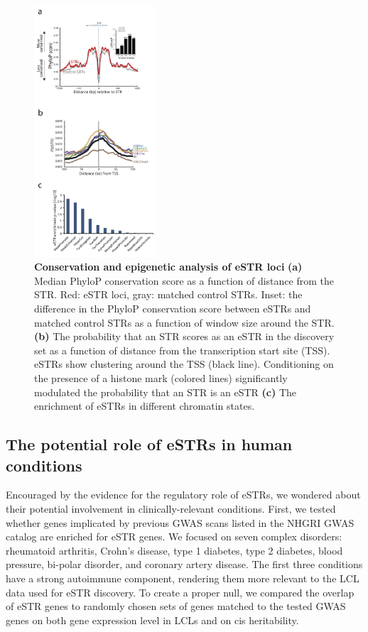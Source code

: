 \begin{figure}[h!]
\centering
\label{fig:estrfig4}
\includegraphics[width=0.4\textwidth]{Figures/Chapter4/Fig4}
\caption{\textbf{Conservation and epigenetic analysis of eSTR loci} \textbf{(a)} Median PhyloP conservation score as a function of distance from the STR. Red: eSTR loci, gray: matched control STRs. Inset: the difference in the PhyloP conservation score between eSTRs and matched control STRs as a function of window size around the STR. \textbf{(b)} The probability that an STR scores as an eSTR in the discovery set as a function of distance from the transcription start site (TSS). eSTRs show clustering around the TSS (black line). Conditioning on the presence of a histone mark (colored lines) significantly modulated the probability that an STR is an eSTR \textbf{(c)} The enrichment of eSTRs in different chromatin states.}
\end{figure}

\subsection{The potential role of eSTRs in human conditions}
Encouraged by the evidence for the regulatory role of eSTRs, we wondered about their potential involvement in clinically-relevant conditions. First, we tested whether genes implicated by previous GWAS scans listed in the NHGRI GWAS catalog \cite{WelterMacArthurMoralesEtAl2014} are enriched for eSTR genes. We focused on seven complex disorders: rheumatoid arthritis, Crohn's disease, type 1 diabetes, type 2 diabetes, blood pressure, bi-polar disorder, and coronary artery disease. The first three conditions have a strong autoimmune component, rendering them more relevant to the LCL data used for eSTR discovery. To create a proper null, we compared the overlap of eSTR genes to randomly chosen sets of genes matched to the tested GWAS genes on both gene expression level in LCLs and on cis heritability.

